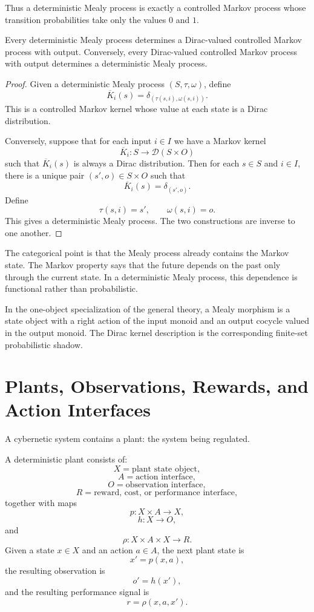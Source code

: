 Thus a deterministic Mealy process is exactly a controlled Markov process whose transition
probabilities take only the values \(0\) and \(1\).

\begin{proposition}
\label{prop:mealy-dirac-markov}
Every deterministic Mealy process determines a Dirac-valued controlled Markov process with output.
Conversely, every Dirac-valued controlled Markov process with output determines a deterministic
Mealy process.
\end{proposition}

\begin{proof}
Given a deterministic Mealy process \((S,\tau,\omega)\), define
\[
\overline K_i(s)=\delta_{(\tau(s,i),\omega(s,i))}.
\]
This is a controlled Markov kernel whose value at each state is a Dirac distribution.

Conversely, suppose that for each input \(i\in I\) we have a Markov kernel
\[
\overline K_i:S\longrightarrow \mathcal D(S\times O)
\]
such that \(\overline K_i(s)\) is always a Dirac distribution.  Then for each \(s\in S\) and
\(i\in I\), there is a unique pair \((s',o)\in S\times O\) such that
\[
\overline K_i(s)=\delta_{(s',o)}.
\]
Define
\[
\tau(s,i)=s',
\qquad
\omega(s,i)=o.
\]
This gives a deterministic Mealy process.  The two constructions are inverse to one another.
\end{proof}

The categorical point is that the Mealy process already contains the Markov state.  The Markov
property says that the future depends on the past only through the current state.  In a deterministic
Mealy process, this dependence is functional rather than probabilistic.

In the one-object specialization of the general theory, a Mealy morphism is a state object with a
right action of the input monoid and an output cocycle valued in the output monoid.  The Dirac
kernel description is the corresponding finite-set probabilistic shadow.

\section{Plants, Observations, Rewards, and Action Interfaces}
\label{sec:plants-observations-rewards}

A cybernetic system contains a plant: the system being regulated.

\begin{definition}
\label{def:deterministic-plant}
A deterministic plant consists of:
\[
X=\text{plant state object},
\]
\[
A=\text{action interface},
\]
\[
O=\text{observation interface},
\]
\[
R=\text{reward, cost, or performance interface},
\]
together with maps
\[
p:X\times A\longrightarrow X,
\]
\[
h:X\longrightarrow O,
\]
and
\[
\rho:X\times A\times X\longrightarrow R.
\]
Given a state \(x\in X\) and an action \(a\in A\), the next plant state is
\[
x'=p(x,a),
\]
the resulting observation is
\[
o'=h(x'),
\]
and the resulting performance signal is
\[
r=\rho(x,a,x').
\]
\end{definition}

